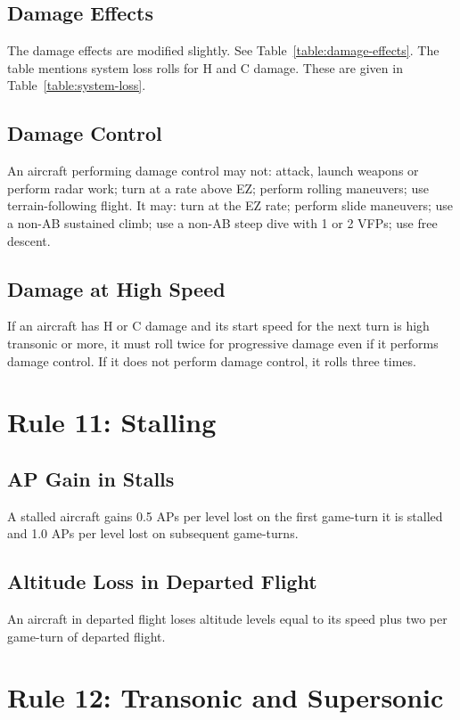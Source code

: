 \documentclass[10pt]{extarticle}
\begin{document}
\subsection{Damage Effects} The damage effects are modified slightly. See Table~\ref{table:damage-effects}. The table mentions system loss rolls for H and C damage. These are given in Table~\ref{table:system-loss}. 

\subsection{Damage Control} An aircraft performing damage control may not: attack, launch weapons or perform radar work; turn at a rate above EZ; perform rolling maneuvers; use terrain-following flight. It may: turn at the EZ rate; perform slide maneuvers; use a non-AB sustained climb; use a non-AB steep dive with 1 or 2 VFPs; use free descent.

\subsection{Damage at High Speed} If an aircraft has H or C damage and its start speed for the next turn is high transonic or more, it must roll twice for progressive damage even if it performs damage control. If it does not perform damage control, it rolls three times.

\section{Rule 11: Stalling}

\subsection{AP Gain in Stalls} A stalled aircraft gains 0.5 APs per level lost on the first game-turn it is stalled and 1.0 APs per level lost on subsequent game-turns.

\subsection{Altitude Loss in Departed Flight} An aircraft in departed flight loses altitude levels equal to its speed plus two per game-turn of departed flight.

\section{Rule 12: Transonic and Supersonic}
\end{document}
